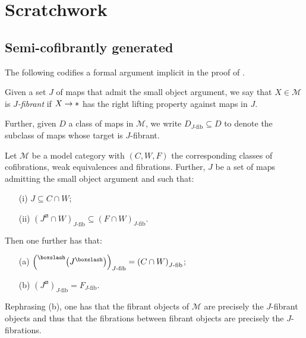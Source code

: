 \documentclass[a4paper,10pt
,draft
]{article}%
\renewcommand{\1}{\eta}%
\begin{document}
\newpage

\section{Scratchwork}




\subsection{Semi-cofibrantly generated}


The following codifies a formal argument implicit in the proof of \cite[Thm. 7.19]{CM13b}.

\begin{definition}
Given a set $J$ of maps that admit the small object argument, we say that $X \in \mathcal{M}$ is \textit{$J$-fibrant} if $X \to \**$ has the right lifting property against maps in $J$.

Further, given $D$ a class of maps in $\mathcal{M}$,
we write $D_{J\text{-fib}} \subseteq D$ to denote 
the subclass of maps whose target is $J$-fibrant.
\end{definition}

\begin{lemma}\label{SEMICOF LEM}
	Let $\mathcal{M}$ be a model category with $(C,W,F)$
	the corresponding classes of cofibrations, weak equivalences and fibrations. 
	Further, $J$ be a set of maps admitting the small object argument and such that:
\begin{itemize}
	\item[(i)] $J \subseteq C \cap W$;
	\item[(ii)] 
	$\left(J^{\boxslash} \cap W \right)_{J\text{-fib}}
	\subseteq \left( F \cap W \right)_{J\text{-fib}}$.
\end{itemize}
Then one further has that:
\begin{itemize}
	\item[(a)]
	$\left(\prescript{\boxslash}{}{\left(J^{\boxslash}\right)}\right)_{J\text{-fib}}
	= 
	\left( C \cap W \right)_{J\text{-fib}}$;
	\item[(b)]
	$\left(J^{\boxslash} \right)_{J\text{-fib}}
	= F_{J\text{-fib}}$.
\end{itemize}
\end{lemma}

\begin{remark}
Rephrasing (b), one has that the fibrant objects of $\mathcal{M}$ are precisely the $J$-fibrant objects
and thus that the fibrations between fibrant objects are precisely the $J$-fibrations.
\end{remark}
\end{document}

